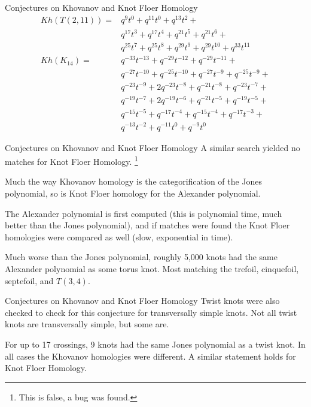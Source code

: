\documentclass{beamer}
\begin{document}
    \begin{frame}{Conjectures on Khovanov and Knot Floer Homology}
        \begin{align}
            Kh(T(2,11))=&q^{9}t^{0}+q^{11}t^{0}+q^{13}t^{2}+\nonumber\\
                &q^{17}t^{3}+q^{17}t^{4}+q^{21}t^{5}+q^{21}t^{6}+\nonumber\\
                &q^{25}t^{7}+q^{25}t^{8}+q^{29}t^{9}+q^{29}t^{10}+q^{33}t^{11}\\
            Kh(K_{14})=&q^{-33}t^{-13}+q^{-29}t^{-12}+q^{-29}t^{-11}+\nonumber\\
                &q^{-27}t^{-10}+q^{-25}t^{-10}+q^{-27}t^{-9}+q^{-25}t^{-9}+\nonumber\\
                &q^{-23}t^{-9}+2q^{-23}t^{-8}+q^{-21}t^{-8}+q^{-23}t^{-7}+\nonumber\\
                &q^{-19}t^{-7}+2q^{-19}t^{-6}+q^{-21}t^{-5}+q^{-19}t^{-5}+\nonumber\\
                &q^{-15}t^{-5}+q^{-17}t^{-4}+q^{-15}t^{-4}+q^{-17}t^{-3}+\nonumber\\
                &q^{-13}t^{-2}+q^{-11}t^{0}+q^{-9}t^{0}
        \end{align}
    \end{frame}
    \begin{frame}{Conjectures on Khovanov and Knot Floer Homology}
        A similar search yielded no matches for Knot Floer Homology.%
        \footnote{\textbf{\color{red}{Correction:}} This is false, a bug was found.}
        \par\hfill\par
        Much the way Khovanov homology is the categorification of the Jones
        polynomial, so is Knot Floer homology for the Alexander polynomial.
        \par\hfill\par
        The Alexander polynomial is first computed (this is polynomial time,
        much better than the Jones polynomial), and if matches were found the
        Knot Floer homologies were compared as well (slow, exponential in time).
        \par\hfill\par
        Much worse than the Jones polynomial, roughly 5,000 knots had the
        same Alexander polynomial as some torus knot. Most matching
        the trefoil, cinquefoil, septefoil, and $T(3,4)$.
    \end{frame}
    \begin{frame}{Conjectures on Khovanov and Knot Floer Homology}
        Twist knots were also checked to check for this conjecture for
        transversally simple knots. Not all twist knots are transversally
        simple, but some are.
        \par\hfill\par
        For up to 17 crossings, 9 knots had the same Jones polynomial as a
        twist knot. In all cases the Khovanov homologies were different.
        A similar statement holds for Knot Floer Homology.
    \end{frame}
\end{document}
